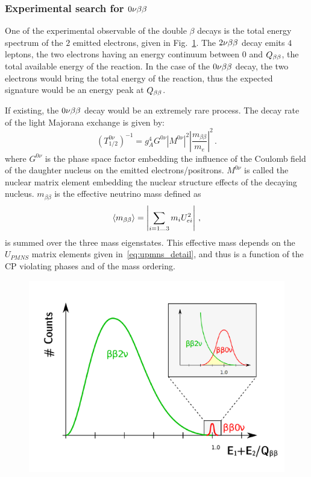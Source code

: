 \subsubsection*{Experimental search for $0\nu\beta\beta$}

One of the experimental observable of the double $\beta$ decays is the total energy spectrum of the $2$ emitted electrons, given in Fig.~\ref{fig:bb_energy}.
The $2\nu\beta\beta$ decay emits $4$ leptons, the two electrons having an energy continuum between $0$ and $Q_{\beta\beta}$, the total available energy of the reaction.
In the case of the $0\nu\beta\beta$ decay, the two electrons would bring the total energy of the reaction, thus the expected signature would be an energy peak at $Q_{\beta\beta}$.

If existing, the $0\nu\beta\beta$ decay would be an extremely rare process.
The decay rate of the light Majorana exchange is given by:
\begin{equation}
  (T_{1/2}^{0\nu})^{-1} = g_{A}^{4}G^{0\nu}|M^{0\nu}|^{2}\left\lvert\dfrac{m_{\beta\beta}}{m_{e}}\right\rvert^{2}\,.
\end{equation}
where $G^{0\nu}$ is the phase space factor embedding the influence of the Coulomb field of the daughter nucleus on the emitted electrons/positrons.
$M^{0\nu}$ is called the nuclear matrix element embedding the nuclear structure effects of the decaying nucleus.
$m_{\beta\beta}$ is the effective neutrino mass defined as
\begin{equation}
  \langle m_{\beta\beta} \rangle = \left\vert \sum_{i=1...3}m_{i}U^{2}_{ei} \right\vert \,,
\end{equation}
is summed over the three mass eigenstates.
This effective mass depends on the $U_{PMNS}$ matrix elements given in~\ref{eq:upmns_detail}, and thus is a function of the CP violating phases and of the mass ordering.

\begin{figure}[h!]
  \centering
    \includegraphics[height=0.6\textwidth]{neutrinophysics/fig_neutrinophysics/reconstructed_energy.pdf}
  \caption{
    \label{fig:bb_energy}}
\end{figure}



